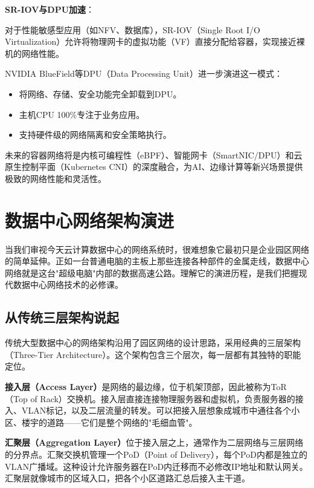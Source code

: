 \textbf{SR-IOV与DPU加速}：

对于性能敏感型应用（如NFV、数据库），SR-IOV（Single Root I/O Virtualization）允许将物理网卡的虚拟功能（VF）直接分配给容器，实现接近裸机的网络性能。

NVIDIA BlueField等DPU（Data Processing Unit）进一步演进这一模式：
\begin{itemize}
    \item 将网络、存储、安全功能完全卸载到DPU。
    \item 主机CPU 100\%专注于业务应用。
    \item 支持硬件级的网络隔离和安全策略执行。
\end{itemize}

未来的容器网络将是内核可编程性（eBPF）、智能网卡（SmartNIC/DPU）和云原生控制平面（Kubernetes CNI）的深度融合，为AI、边缘计算等新兴场景提供极致的网络性能和灵活性。


\section{数据中心网络架构演进}

当我们审视今天云计算数据中心的网络系统时，很难想象它最初只是企业园区网络的简单延伸。正如一台普通电脑的主板上那些连接各种部件的金属走线，数据中心网络就是这台"超级电脑"内部的数据高速公路。理解它的演进历程，是我们把握现代数据中心网络技术的必修课。

\subsection{从传统三层架构说起}

传统大型数据中心的网络架构沿用了园区网络的设计思路，采用经典的三层架构（Three-Tier Architecture）。这个架构包含三个层次，每一层都有其独特的职能定位。

\textbf{接入层（Access Layer）}是网络的最边缘，位于机架顶部，因此被称为ToR（Top of Rack）交换机。接入层直接连接物理服务器和虚拟机，负责服务器的接入、VLAN标记，以及二层流量的转发。可以把接入层想象成城市中通往各个小区、楼宇的道路——它们是整个网络的"毛细血管"。

\textbf{汇聚层（Aggregation Layer）}位于接入层之上，通常作为二层网络与三层网络的分界点。汇聚交换机管理一个PoD（Point of Delivery），每个PoD内都是独立的VLAN广播域。这种设计允许服务器在PoD内迁移而不必修改IP地址和默认网关。汇聚层就像城市的区域入口，把各个小区道路汇总后接入主干道。


